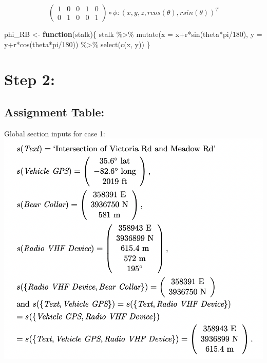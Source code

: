 \documentclass[
]{article}
\newenvironment{Shaded}{\begin{snugshade}}{\end{snugshade}}
\newcommand{\AttributeTok}[1]{\textcolor[rgb]{0.77,0.63,0.00}{#1}}
\newcommand{\ControlFlowTok}[1]{\textcolor[rgb]{0.13,0.29,0.53}{\textbf{#1}}}
\newcommand{\DecValTok}[1]{\textcolor[rgb]{0.00,0.00,0.81}{#1}}
\newcommand{\FunctionTok}[1]{\textcolor[rgb]{0.00,0.00,0.00}{#1}}
\newcommand{\NormalTok}[1]{#1}
\newcommand{\OtherTok}[1]{\textcolor[rgb]{0.56,0.35,0.01}{#1}}
\newcommand{\SpecialCharTok}[1]{\textcolor[rgb]{0.00,0.00,0.00}{#1}}
\begin{document}
\[\begin{pmatrix}
1 & 0 & 0 & 1 & 0\\
0 & 1 & 0 & 0 & 1
\end{pmatrix} \circ
\phi:(x, y, z, r cos(\theta), rsin(\theta))^T  \]

\begin{Shaded}
\begin{Highlighting}[]
\NormalTok{phi\_RB }\OtherTok{\textless{}{-}} \ControlFlowTok{function}\NormalTok{(stalk)\{}
\NormalTok{  stalk }\SpecialCharTok{\%\textgreater{}\%}
    \FunctionTok{mutate}\NormalTok{(}\AttributeTok{x =}\NormalTok{ x}\SpecialCharTok{+}\NormalTok{r}\SpecialCharTok{*}\FunctionTok{sin}\NormalTok{(theta}\SpecialCharTok{*}\NormalTok{pi}\SpecialCharTok{/}\DecValTok{180}\NormalTok{), }\AttributeTok{y =}\NormalTok{ y}\SpecialCharTok{+}\NormalTok{r}\SpecialCharTok{*}\FunctionTok{cos}\NormalTok{(theta}\SpecialCharTok{*}\NormalTok{pi}\SpecialCharTok{/}\DecValTok{180}\NormalTok{)) }\SpecialCharTok{\%\textgreater{}\%}
    \FunctionTok{select}\NormalTok{(}\FunctionTok{c}\NormalTok{(x, y))}
\NormalTok{\}}
\end{Highlighting}
\end{Shaded}

\hypertarget{section-1}{%
\section{\texorpdfstring{\textbf{Step 2:}}{}}\label{section-1}}

\hypertarget{assignment-table}{%
\subsection{Assignment Table:}\label{assignment-table}}

Global section inputs for case 1: \includegraphics{GeoGlobalSect1.png}
\end{document}
